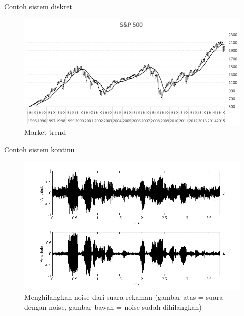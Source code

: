 \documentclass[aspectratio=169]{beamer}
\begin{document}
\begin{frame}{Contoh sistem diskret}
	\begin{figure}
		\centering
		\includegraphics[height=0.7\textheight]{gambar/00.proses_sinyal_diskret}
		\caption{Market trend}
	\end{figure}
\end{frame}

\begin{frame}{Contoh sistem kontinu}
	\begin{figure}
		\centering
		\includegraphics[height=0.7\textheight]{gambar/00.proses_sinyal_kontinu}
		\caption{Menghilangkan noise dari suara rekaman (gambar atas = suara dengan noise, gambar bawah = noise sudah dihilangkan)}
	\end{figure}
\end{frame}
\end{document}
